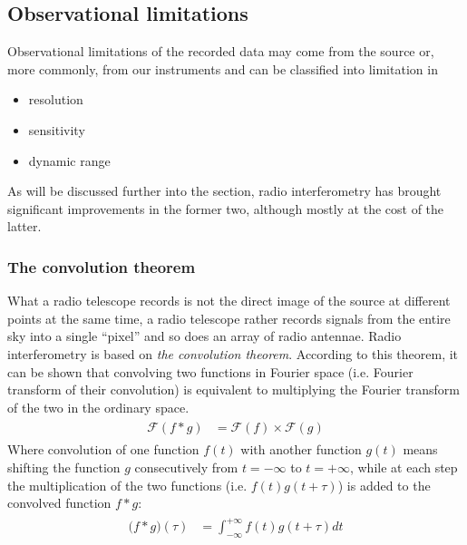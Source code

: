 \documentclass[paper=a4, fontsize=11pt]{scrartcl} %
\numberwithin{equation}{section} %
\numberwithin{figure}{section} %
\numberwithin{table}{section} %
\begin{document}
\subsection{Observational limitations}
Observational limitations of the recorded data may come from the source or, more commonly, from our instruments and can be classified into limitation in 
\begin{itemize}
\item resolution
\item sensitivity
\item dynamic range
\end{itemize}
As will be discussed further into the section, radio interferometry has brought significant improvements in the former two, although mostly at the cost of the latter.

\subsubsection*{The convolution theorem}
What a radio telescope records is not the direct image of the source at different points at the same time, a radio telescope rather records signals from the entire sky into a single ``pixel'' and so does an array of radio antennae. Radio interferometry is based on \emph{the convolution theorem}. According to this theorem, it can be shown that convolving two functions in Fourier space (i.e. Fourier transform of their convolution) is equivalent to multiplying the Fourier transform of the two in the ordinary space.
\begin{align} 
\begin{split}
\mathcal{F}(f*g) &= \mathcal{F}(f) \times \mathcal{F}(g)
\end{split}                    
\end{align}
Where convolution of one function $f(t)$ with another function $g(t)$ means shifting the function $g$ consecutively from $t=-\infty$ to $t=+\infty$, while at each step the multiplication of the two functions (i.e. $f(t)g(t+\tau)$) is added to the convolved function $f*g$:
\begin{align} 
\begin{split}
\mathcal (f*g)(\tau) &= \int_{-\infty}^{+\infty} f(t)g(t+\tau) dt
\end{split}                    
\end{align}
\end{document}
